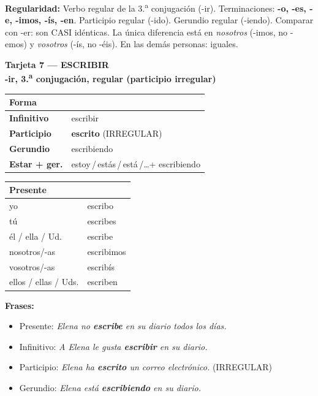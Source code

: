 \documentclass[a4paper,10pt]{article}
\newcommand{\verboheader}[3]{%
  \noindent
  \colorbox{azulverbo!90}{\parbox{\dimexpr\linewidth-2\fboxsep}{%
    \centering\color{white}\bfseries\large Tarjeta #1 --- #2\\[2pt]
    \normalsize #3%
  }}
  \vspace{4pt}
}
\begin{document}
\begin{trucoverbo}
\textbf{Regularidad:} Verbo regular de la 3.\textsuperscript{a} conjugación (-ir). Terminaciones: \textbf{-o, -es, -e, -imos, -ís, -en}. Participio regular (-ido). Gerundio regular (-iendo). Comparar con -er: son CASI idénticas. La única diferencia está en \textit{nosotros} (-imos, no -emos) y \textit{vosotros} (-ís, no -éis). En las demás personas: iguales.
\end{trucoverbo}

\newpage

\verboheader{7}{ESCRIBIR}{-ir, 3.\textsuperscript{a} conjugación, regular (participio irregular)}

\begin{minipage}[t]{0.48\linewidth}
\small
\begin{tabular}{|>{\bfseries}l|l|}
\hline
\rowcolor{azulverbo!15} Forma & \\
\hline
Infinitivo & escribir \\
\hline
\rowcolor{grisclaro}
Participio & \textcolor{rojoirr}{\textbf{escrito}} {\footnotesize (IRREGULAR)} \\
\hline
Gerundio & escribiendo \\
\hline
\rowcolor{grisclaro}
Estar + ger. & estoy\,/\,estás\,/\,está\,/\ldots\;+ escribiendo \\
\hline
\end{tabular}
\end{minipage}
\hfill
\begin{minipage}[t]{0.48\linewidth}
\small
\begin{tabular}{|l|l|}
\hline
\rowcolor{azulverbo!15} \textbf{Presente} & \\
\hline
yo & escribo \\
\hline
\rowcolor{grisclaro}
tú & escribes \\
\hline
él / ella / Ud. & escribe \\
\hline
\rowcolor{grisclaro}
nosotros/-as & escribimos \\
\hline
vosotros/-as & escribís \\
\hline
\rowcolor{grisclaro}
ellos / ellas / Uds. & escriben \\
\hline
\end{tabular}
\end{minipage}

\vspace{4pt}
\small
\textbf{Frases:}
\begin{itemize}[nosep, leftmargin=1em]
\item Presente: \textit{Elena no \textbf{escribe} en su diario todos los días.}
\item Infinitivo: \textit{A Elena le gusta \textbf{escribir} en su diario.}
\item Participio: \textit{Elena ha \textbf{\textcolor{rojoirr}{escrito}} un correo electrónico.} {\footnotesize (\textcolor{rojoirr}{IRREGULAR})}
\item Gerundio: \textit{Elena está \textbf{escribiendo} en su diario.}
\end{itemize}
\end{document}
